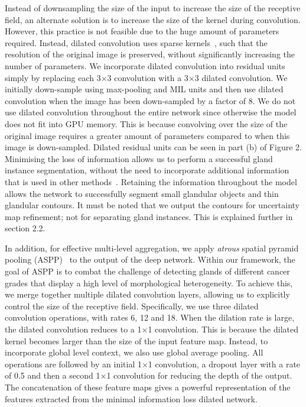 \documentclass[3p]{elsarticle}
\begin{document}
Instead of downsampling the size of the input to increase the size of the receptive field, an alternate solution is to increase the size of the kernel during convolution. However, this practice is not feasible due to the huge amount of parameters required. Instead, dilated convolution uses sparse kernels~\citep{yu2015multi}, such that the resolution of the original image is preserved, without significantly increasing the number of parameters. We incorporate dilated convolution into residual units simply by replacing each 3$\times$3 convolution with a 3$\times$3 dilated convolution. We initially down-sample using max-pooling and MIL units and then use dilated convolution when the image has been down-sampled by a factor of 8. We do not use dilated convolution throughout the entire network since otherwise the model does not fit into GPU memory. This is because convolving over the size of the original image requires a greater amount of parameters compared to when this image is down-sampled. Dilated residual units can be seen in part (b) of Figure 2. Minimising the loss of information allows us to perform a successful gland instance segmentation, without the need to incorporate additional information that is used in other methods~\citep{chen2017dcan}. Retaining the information throughout the model allows the network to successfully segment small glandular objects and thin glandular contours. It must be noted that we output the contours for uncertainty map refinement; not for separating gland instances. This is explained further in section 2.2. 

In addition, for effective multi-level aggregation, we apply \textit{atrous} spatial pyramid pooling (ASPP)~\citep{chen2018deeplab} to the output of the deep network. Within our framework, the goal of ASPP is to combat the challenge of detecting glands of different cancer grades that display a high level of morphological heterogeneity. To achieve this, we merge together multiple dilated convolution layers, allowing us to explicitly control the size of the receptive field. Specifically, we use three dilated convolution operations, with rates 6, 12 and 18. When the dilation rate is large, the dilated convolution reduces to a 1$\times$1 convolution. This is because the dilated kernel becomes larger than the size of the input feature map. Instead, to incorporate global level context, we also use global average pooling. All operations are followed by an initial 1$\times$1 convolution, a dropout layer with a rate of 0.5 and then a second 1$\times$1 convolution for reducing the depth of the output. The concatenation of these feature maps gives a powerful representation of the features extracted from the minimal information loss dilated network.
\end{document}
